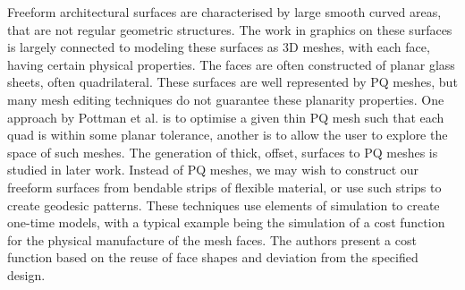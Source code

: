 Freeform architectural surfaces are characterised by large smooth curved areas, that are not regular geometric structures. The work in graphics on these surfaces is largely connected to modeling these surfaces as 3D meshes, with each face, having certain physical properties. The faces are often constructed of planar glass sheets, often quadrilateral. These surfaces are well represented by PQ meshes, but many mesh editing techniques do not guarantee these planarity properties. One approach by Pottman et al. is to optimise a given thin PQ mesh such that each quad is within some planar tolerance\cite{Liu06}, another is to allow the user to explore the space of such meshes\cite{Yang11}. The generation of thick, offset, surfaces to PQ meshes is studied in later work\cite{Pottmann2007}. Instead of PQ meshes, we may wish to construct our freeform surfaces from bendable strips of flexible material\cite{Pottmann08}, or use such strips to create geodesic patterns\cite{Pottmann10}. These techniques use elements of simulation to create one-time models, with a typical example being the simulation of a cost function for the physical manufacture of the mesh faces\cite{Eigensatz10}. The authors present a cost function based on the reuse of face shapes and deviation from the specified design.





